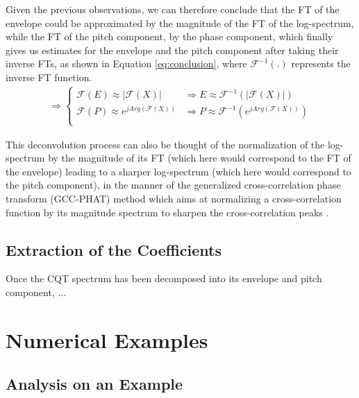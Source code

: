 \documentclass[journal]{IEEEtran}
\begin{document}
Given the previous observations, we can therefore conclude that the FT of the envelope could be approximated by the magnitude of the FT of the log-spectrum, while the FT of the pitch component, by the phase component, which finally gives us estimates for the envelope and the pitch component after taking their inverse FTs, as shown in Equation \ref{eq:conclusion}, where $\mathcal{F}^{-1}(.)$ represents the inverse FT function.
\begin{equation}
\label{eq:conclusion}
\begin{split}
\Rightarrow 
\begin{cases}
\mathcal{F}(E) \approx |\mathcal{F}(X)| &\Rightarrow E \approx \mathcal{F}^{-1}(|\mathcal{F}(X)|) \\
\mathcal{F}(P) \approx e^{j Arg(\mathcal{F}(X))} &\Rightarrow P \approx \mathcal{F}^{-1}(e^{j Arg(\mathcal{F}(X))}) \\
\end{cases}
\end{split}
\end{equation}

This deconvolution process can also be thought of the normalization of the log-spectrum by the magnitude of its FT (which here would correspond to the FT of the envelope) leading to a sharper log-spectrum (which here would correspond to the pitch component), in the manner of the generalized cross-correlation phase transform (GCC-PHAT) method which aims at normalizing a cross-correlation function by its magnitude spectrum to sharpen the cross-correlation peaks \cite{knapp1976}.


\subsection{Extraction of the Coefficients}

Once the CQT spectrum has been decomposed into its envelope and pitch component, ...



\section{Numerical Examples} %

\subsection{Analysis on an Example}

\end{document}
